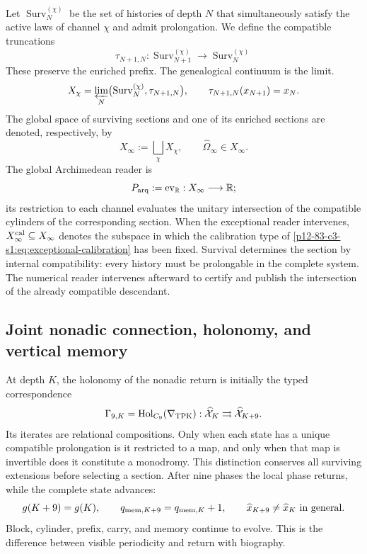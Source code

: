 {Let \(\operatorname{Surv}^{(\chi)}_N\) be the set of histories of
depth \(N\) that simultaneously satisfy the active laws of channel
\(\chi\) and admit prolongation. We define the compatible truncations
\[
\tau_{N+1,N}:\operatorname{Surv}^{(\chi)}_{N+1}
\longrightarrow\operatorname{Surv}^{(\chi)}_N
\]
These preserve the enriched prefix. The genealogical continuum is the limit.
\begin{equation}
X_\chi=\varprojlim_N
\bigl(\operatorname{Surv}^{(\chi)}_N,\tau_{N+1,N}\bigr),
\qquad
\tau_{N+1,N}(x_{N+1})=x_N.
\label{p12-83-c3-s1:eq:inverse-survival}
\end{equation}
The global space of surviving sections and one of its enriched sections
are denoted, respectively, by
\begin{equation}
X_\infty:=\bigsqcup_\chi X_\chi,
\qquad
\widehat\Omega_\infty\in X_\infty.
\label{p12-83-c3-s1:eq:global-survival-space}
\end{equation}
The global Archimedean reader is
\begin{equation}
P_{\rm arq}:=\operatorname{ev}_{\mathbb R}:
X_\infty\longrightarrow\mathbb R;
\label{p12-83-c3-s1:eq:archimedean-reader}
\end{equation}
its restriction to each channel evaluates the unitary intersection of the compatible cylinders of the corresponding section. When the exceptional reader intervenes, \(X_\infty^{\rm cal}\subseteq
X_\infty\) denotes the subspace in which the calibration type of \eqref{p12-83-c3-s1:eq:exceptional-calibration} has been fixed. Survival determines the section by internal compatibility: every history must be prolongable in the complete system. The numerical reader intervenes afterward to certify and publish the intersection of the already compatible descendant.

\subsection{Joint nonadic connection, holonomy, and vertical memory}

At depth \(K\), the holonomy of the nonadic return is initially the typed correspondence
\begin{equation}
\Gamma_{9,K}=\operatorname{Hol}_{C_9}(\nabla_{\rm TPK}):
\widehat{\mathcal X}_K\rightrightarrows
\widehat{\mathcal X}_{K+9}.
\label{p12-83-c3-s1:eq:gamma9}
\end{equation}
Its iterates are relational compositions. Only when each state has
a unique compatible prolongation is it restricted to a map, and only when that
map is invertible does it constitute a monodromy. This distinction conserves all
surviving extensions before selecting a section.
After nine phases the local phase returns, while the complete state advances:
\[
g(K+9)=g(K),\qquad q_{{\rm mem},K+9}=q_{{\rm mem},K}+1,
\qquad \widehat x_{K+9}\ne\widehat x_K\ \text{in general}.
\]
Block, cylinder, prefix, carry, and memory continue to evolve. This
is the difference between visible periodicity and return with biography.

}
